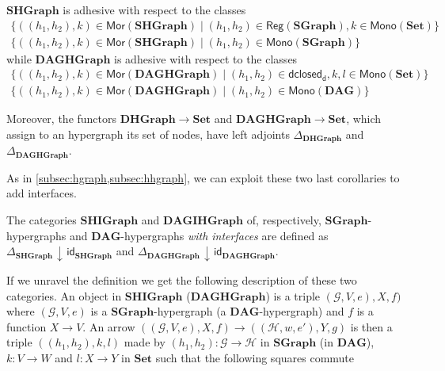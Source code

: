 \documentclass[runningheads,envcountsect]{lmcs}
\newcommand{\dgr}{\catname{SGraph}}
\newcommand{\dg}{\catname{DAG}}
\newcommand{\rtd}{\mathsf{dclosed_{d}}}
\newcommand{\catname}[1]{\mathbf{#1}}
\newcommand{\arr}[1]{\mathsf{Mor}(\catname{#1})}
\newcommand{\mono}[1]{\mathsf{Mono}(\catname{#1})}
\newcommand{\reg}[1]{\mathsf{Reg}(\catname{#1})}
\newcommand{\id}[1]{\mathsf{id}_{#1}}
\newcommand{\comma}[2]{#1\hspace{1pt} {\downarrow}\hspace{1pt} #2}
\theoremstyle{plain}
\theoremstyle{definition}
\begin{document}
\begin{thm}\label{thm:dg}
	$\catname{SHGraph}$ is adhesive with respect to the classes
	\begin{gather*}
	\{((h_1,h_2), k)\in \arr{SHGraph}\mid (h_1,h_2)\in \reg{\dgr}, k \in \mono{Set}\}\\
	\{((h_1,h_2), k)\in \arr{SHGraph}\mid (h_1,h_2)\in \mono{\dgr}\}
	\end{gather*}
	while $\catname{DAGHGraph}$ is adhesive with respect to the classes	\begin{gather*}
	\{((h_1,h_2), k)\in \arr{DAGHGraph}\mid (h_1,h_2)\in \rtd, k, l \in \mono{Set}\}\\
	\{((h_1,h_2), k)\in \arr{DAGHGraph}\mid (h_1,h_2)\in \mono{\dg}\}
	\end{gather*}
	
	Moreover, the functors $\catname{DHGraph}\to \catname{Set}$ and  $\catname{DAGHGraph}\to \catname{Set}$, which assign to an hypergraph its set of nodes, have left adjoints $\Delta_{\catname{DHGraph}}$  and $\Delta_{\catname{DAGHGraph}}$.
\end{thm}

 
  
 As in \cref{subsec:hgraph,subsec:hhgraph}, we can exploit these two last corollaries to add interfaces.
 
 \begin{defi}
 The categories $\catname{SHIGraph}$ and $\catname{DAGIHGraph}$ of, respectively, $\dgr$-hypergraphs and $\dg$-hypergraphs \emph{with interfaces} are defined as $\comma{\Delta_{\catname{SHGraph}}}{\id{\catname{SHGraph}}}$ and $\comma{\Delta_{\catname{DAGHGraph}}}{\id{\catname{DAGHGraph}}}$.
 \end{defi}

If we unravel the definition we get the following description of these two categories.
An object in $\catname{SHIGraph}$ ($\catname{DAGHGraph}$) is a triple $(\mathcal{G}, V, e), X, f)$ where $(\mathcal{G}, V, e)$ is a $\dgr$-hypergraph (a $\dg$-hypergraph) and $f$ is a function $X\rightarrow V$.  An arrow $((\mathcal{G}, V, e), X, f)\to ((\mathcal{H}, w, e'), Y, g)$ is then a triple $((h_1, h_2),k,l)$ made by $(h_1, h_2):\mathcal{G}\rightarrow \mathcal{H}$ in $\dgr$ (in $\dg$),  $k:V\to W$ and $l:X\rightarrow Y$ in $\catname{Set}$ such that the following squares commute
	\begin{center}
	\end{center}
\end{document}
